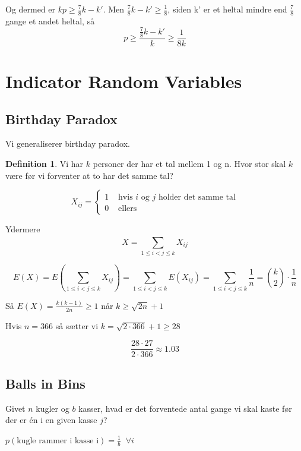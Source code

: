 \documentclass[11pt]{article}
\theoremstyle{definition}
\newtheorem{definition}{Definition}
\theoremstyle{remark}
\begin{document}
Og dermed er $kp \geq \frac{7}{8}k - k'$. Men $\frac{7}{8}k - k' \geq \frac{1}{8}$, siden k' er et heltal mindre end $\frac{7}{8}$ gange et andet heltal, så
\[
p \geq \frac{\frac{7}{8}k - k'}{k} \geq \frac{1}{8k}
\]


\label{subsec:label}



\newpage

\section{Indicator Random Variables}
\label{sec:indicator}


\subsection{Birthday Paradox}
\label{subsec:label}

Vi generaliserer birthday paradox.
\begin{definition}
Vi har $k$ personer der har et tal mellem 1 og n. Hvor stor skal $k$ være før vi forventer at to har det samme tal?
\end{definition}

\[
X_{ij} = \begin{cases}
  1 & \text{ hvis } i \text{ og } j \text{ holder det samme tal}\\
  0 & \text{ ellers}
\end{cases}
\]

Ydermere
\[
  X = \sum_{1 \leq i < j \leq k}^{}X_{ij}
\]

\[
E(X) = E(\sum_{1 \leq i < j \leq k}^{}X_{ij}) = \sum_{1 \leq i < j \leq k}^{} E(X_{ij}) = \sum_{1 \leq i < j \leq k}^{} \frac{1}{n} = \binom{k}{2} \cdot \frac{1}{n}
\]

Så $E(X) = \frac{k(k-1)}{2n} \geq 1$ når $k \geq \sqrt{2n}+1$

Hvis $n = 366$  så sætter vi $k = \sqrt{2 \cdot 366}+1 \geq 28$

\[
\frac{28 \cdot 27}{2 \cdot 366} \approx 1.03
\]

\subsection{Balls in Bins}
\label{subsec:label}

Givet $n$ kugler og $b$ kasser, hvad er det forventede antal gange vi skal kaste før der er én i en given kasse $j$?

$p(\text{kugle rammer i kasse i}) = \frac{1}{b}\;\; \forall i$
\end{document}
